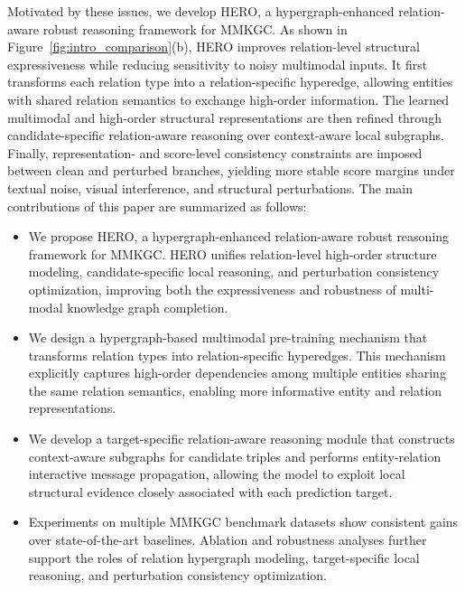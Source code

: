 \documentclass[pdflatex,sn-mathphys-num]{sn-jnl}
\begin{document}
Motivated by these issues, we develop HERO, a hypergraph-enhanced relation-aware robust reasoning framework for MMKGC. As shown in Figure~\ref{fig:intro_comparison}(b), HERO improves relation-level structural expressiveness while reducing sensitivity to noisy multimodal inputs. It first transforms each relation type into a relation-specific hyperedge, allowing entities with shared relation semantics to exchange high-order information. The learned multimodal and high-order structural representations are then refined through candidate-specific relation-aware reasoning over context-aware local subgraphs. Finally, representation- and score-level consistency constraints are imposed between clean and perturbed branches, yielding more stable score margins under textual noise, visual interference, and structural perturbations.
The main contributions of this paper are summarized as follows:

\begin{itemize}
    \item We propose HERO, a hypergraph-enhanced relation-aware robust reasoning framework for MMKGC. HERO unifies relation-level high-order structure modeling, candidate-specific local reasoning, and perturbation consistency optimization, improving both the expressiveness and robustness of multi-modal knowledge graph completion.

    \item We design a hypergraph-based multimodal pre-training mechanism that transforms relation types into relation-specific hyperedges. This mechanism explicitly captures high-order dependencies among multiple entities sharing the same relation semantics, enabling more informative entity and relation representations.

    \item We develop a target-specific relation-aware reasoning module that constructs context-aware subgraphs for candidate triples and performs entity-relation interactive message propagation, allowing the model to exploit local structural evidence closely associated with each prediction target.

    \item Experiments on multiple MMKGC benchmark datasets show consistent gains over state-of-the-art baselines. Ablation and robustness analyses further support the roles of relation hypergraph modeling, target-specific local reasoning, and perturbation consistency optimization.


\end{itemize}
\end{document}
